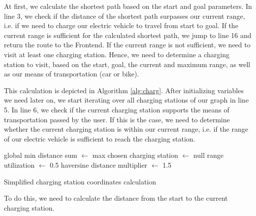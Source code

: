\documentclass[a4paper]{article}
\begin{document}
At first, we calculate the shortest path based on the start and goal parameters.
In line 3, we check if the distance of the shortest path surpasses our current range, i.e. if we need to charge our electric vehicle to travel from start to goal.
If the current range is sufficient for the calculated shortest path, we jump to line 16 and return the route to the Frontend.
If the current range is not sufficient, we need to visit at least one charging station.
Hence, we need to determine a charging station to visit, based on the start, goal, the current and maximum range, as well as our means of transportation (car or bike).\par\medskip
This calculation is depicted in Algorithm \ref{alg:charg}. 
After initializing variables we need later on, we start iterating over all charging stations of our graph in line 5.
In line 6, we check if the current charging station supports the means of transportation passed by the user.
If this is the case, we need to determine whether the current charging station is within our current range, i.e. if the range of our electric vehicle is sufficient to reach the charging station.
\par\bigskip
\begin{algorithm}[H]
	
	global min distance sum $\leftarrow$ max\;
	chosen charging station $\leftarrow$ null\;
	range utilization $\leftarrow$ 0.5\;
	haversine distance multiplier $\leftarrow$ 1.5\;
	\caption{Simplified charging station coordinates calculation}
	\label{alg:charg}
\end{algorithm}\par\bigskip
To do this, we need to calculate the distance from the start to the current charging station.
\end{document}
